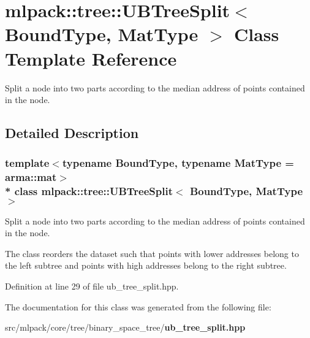\section{mlpack\+:\+:tree\+:\+:U\+B\+Tree\+Split$<$ Bound\+Type, Mat\+Type $>$ Class Template Reference}
\label{classmlpack_1_1tree_1_1UBTreeSplit}


Split a node into two parts according to the median address of points contained in the node.  




\subsection{Detailed Description}
\subsubsection*{template$<$typename Bound\+Type, typename Mat\+Type = arma\+::mat$>$\\*
class mlpack\+::tree\+::\+U\+B\+Tree\+Split$<$ Bound\+Type, Mat\+Type $>$}

Split a node into two parts according to the median address of points contained in the node. 

The class reorders the dataset such that points with lower addresses belong to the left subtree and points with high addresses belong to the right subtree. 

Definition at line 29 of file ub\+\_\+tree\+\_\+split.\+hpp.



The documentation for this class was generated from the following file\+:\begin{DoxyCompactItemize}
\item 
src/mlpack/core/tree/binary\+\_\+space\+\_\+tree/{\bf ub\+\_\+tree\+\_\+split.\+hpp}\end{DoxyCompactItemize}

